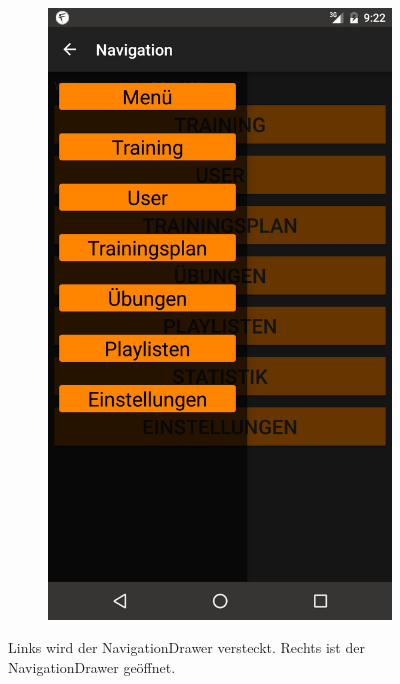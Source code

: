 \documentclass[FIPLY_base.tex]{subfiles}
\begin{document}
\begin{figure}[h]
\begin{subfigure}[b]{0.3\textwidth}
	\includegraphics[scale=0.15]{img/NavDrawerOpened}
	\end{subfigure}
	\caption{Links wird der NavigationDrawer versteckt. Rechts ist der NavigationDrawer geöffnet.}
\end{figure}
\end{document}
